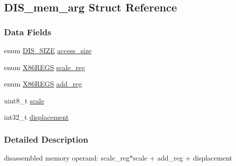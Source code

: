 \hypertarget{struct_d_i_s__mem__arg}{
\subsection{DIS\_\-mem\_\-arg Struct Reference}
\label{struct_d_i_s__mem__arg}
}
\subsubsection*{Data Fields}
\begin{DoxyCompactItemize}
\item 
enum \hyperlink{bytecode__disasm_8h_a6a0d419b6b61630b1f76a25ff39df84d}{DIS\_\-SIZE} \hyperlink{struct_d_i_s__mem__arg_abe85ed51a3596cdb3a868a284c3d961f}{access\_\-size}
\item 
enum \hyperlink{bytecode__disasm_8h_a87af2e927a80478796188d9d8d813d82}{X86REGS} \hyperlink{struct_d_i_s__mem__arg_afb3d2d6aee6f877fd62b8ffc576d9351}{scale\_\-reg}
\item 
enum \hyperlink{bytecode__disasm_8h_a87af2e927a80478796188d9d8d813d82}{X86REGS} \hyperlink{struct_d_i_s__mem__arg_abdbd08c3d265ff494ad5ff1006cc6a73}{add\_\-reg}
\item 
uint8\_\-t \hyperlink{struct_d_i_s__mem__arg_a616c0a72f0e4af38b93c736773ac7210}{scale}
\item 
int32\_\-t \hyperlink{struct_d_i_s__mem__arg_a241d2c58aca95f8589148d4acf97406d}{displacement}
\end{DoxyCompactItemize}


\subsubsection{Detailed Description}
disassembled memory operand: scale\_\-reg$\ast$scale + add\_\-reg + displacement 

